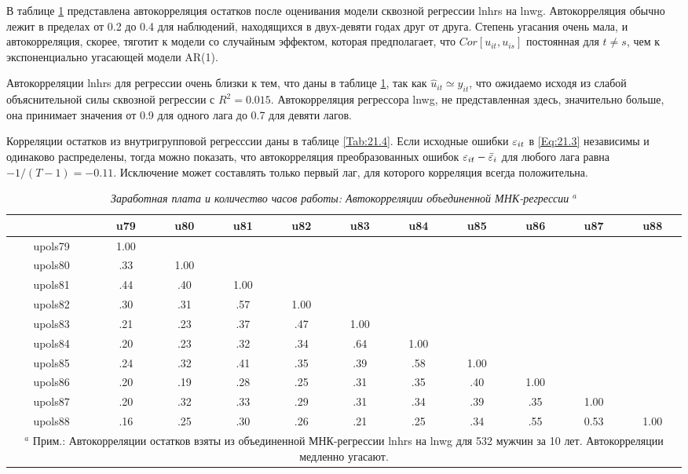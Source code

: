 В таблице \ref{Tab:21.3} представлена автокорреляция остатков после оценивания модели сквозной регрессии lnhrs на lnwg. Автокорреляция обычно лежит в пределах от 0.2 до 0.4 для наблюдений, находящихся в двух-девяти годах друг от друга. Степень угасания очень мала, и автокорреляция, скорее, тяготит к модели со случайным эффектом, которая предполагает, что $Cor[u_{it}, u_{is}]$  постоянная для $t \neq s$, чем к экспоненциально угасающей модели AR(1).

Автокорреляции lnhrs для регрессии очень близки к тем, что даны в таблице \ref{Tab:21.3}, так как $\hat{u}_{it} \simeq y_{it}$, что ожидаемо исходя из слабой объяснительной силы сквозной регрессии с $R^2=0.015$. Автокорреляция регрессора lnwg, не представленная здесь, значительно больше, она принимает значения от 0.9 для одного лага до 0.7 для девяти лагов.

Корреляции остатков из внутригрупповой регресссии даны в таблице \ref{Tab:21.4}. Если исходные ошибки $\varepsilon_{it}$ в \ref{Eq:21.3} независимы и одинаково распределены, тогда можно показать, что автокорреляция преобразованных ошибок $\varepsilon_{it}-\bar{\varepsilon}_i$ для любого лага равна $-1/(T-1)=-0.11$. Исключение может составлять только первый лаг, для которого корреляция всегда положительна.


\begin{table}[ht]
\caption{{\it Заработная плата и количество часов работы: Автокорреляции объединенной МНК-регрессии} ${}^a$} 
\centering
\begin{tabular}{ccccccccccc}
\hline \hline
	&	\textbf{u79} & \textbf{u80} & \textbf{u81} & \textbf{u82} & \textbf{u83} & \textbf{u84} & \textbf{u85} & \textbf{u86} & \textbf{u87} & \textbf{u88}  \\
\hline
upols79 & 1.00 & & & & & & & & & \\
upols80 & .33 	& 1.00 & & & & & & & & \\
upols81 & .44	& .40 & 1.00 & & & & & & & \\
upols82 & .30	& .31 & .57 & 1.00 & & & & & & \\
upols83 & .21	& .23 & .37 & .47 & 1.00 & & & & & \\
upols84 & .20	& .23 & .32 & .34 & .64 & 1.00 & & & & \\
upols85 & .24	& .32 & .41 & .35 & .39 & .58 & 1.00 & & & \\
upols86 & .20	& .19 & .28 & .25 & .31 & .35 & .40 & 1.00 & & \\
upols87 & .20	& .32 & .33 & .29 & .31 & .34 & .39 & .35 & 1.00 & \\
upols88 & .16	& .25 & .30 & .26 & .21 & .25 & .34 & .55 & 0.53 &  1.00\\
\hline \hline
\multicolumn{11}{p{15cm}}{${}^a$ Прим.: Автокорреляции остатков взяты из объединенной МНК-регрессии lnhrs на lnwg для 532 мужчин за 10 лет. Автокорреляции медленно угасают.}
\end{tabular}
\label{Tab:21.3}
\end{table}

